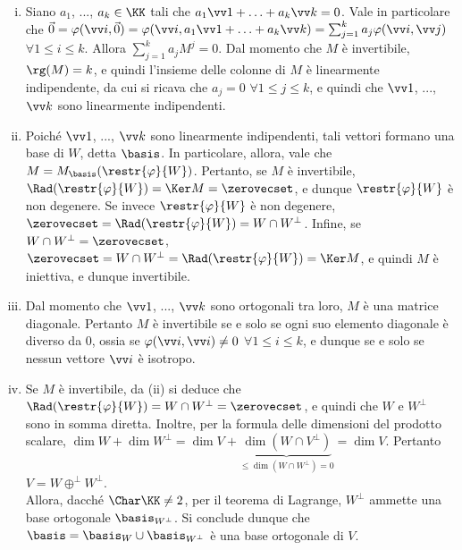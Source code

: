 \documentclass[11pt]{article}
\begin{document}
	\begin{solution}
		\begin{enumerate}[(i)]
			\item Siano $a_1$, ..., $a_k \in \KK$ tali che $a_1 \vv 1 + \ldots + a_k \vv k = 0$. Vale in
			particolare che $\vec 0 = \varphi(\vv i, \vec 0) = \varphi(\vv i, a_1 \vv 1 + \ldots + a_k \vv k) =
			\sum_{j=1}^k a_j \varphi(\vv i, \vv j)$ $\forall 1 \leq i \leq k$. Allora $\sum_{j=1}^k a_j M^j = 0$.
			Dal momento che $M$ è invertibile, $\rg(M) = k$, e quindi l'insieme delle colonne di $M$ è linearmente
			indipendente, da cui si ricava che $a_j = 0$ $\forall 1 \leq j \leq k$, e quindi che $\vv 1$, ...,
			$\vv k$ sono linearmente indipendenti.
			
			\item Poiché $\vv 1$, ..., $\vv k$ sono linearmente indipendenti, tali vettori formano una base di
			$W$, detta $\basis$. In particolare, allora, vale che $M = M_\basis(\restr{\varphi}{W})$. Pertanto,
			se $M$ è invertibile, $\Rad(\restr{\varphi}{W}) = \Ker M = \zerovecset$, e dunque $\restr{\varphi}{W}$
			è non degenere. Se invece $\restr{\varphi}{W}$ è non degenere, $\zerovecset = \Rad(\restr{\varphi}{W}) = W \cap W^\perp$. Infine, se $W \cap W^\perp = \zerovecset$, $\zerovecset = W \cap W^\perp = \Rad(\restr{\varphi}{W}) = \Ker M$, e quindi $M$ è iniettiva, e dunque invertibile.
			
			\item Dal momento che $\vv 1$, ..., $\vv k$ sono ortogonali tra loro, $M$ è una matrice diagonale.
			Pertanto $M$ è invertibile se e solo se ogni suo elemento diagonale è diverso da $0$, ossia
			se $\varphi(\vv i, \vv i) \neq 0$ $\forall 1 \leq i \leq k$, e dunque se e solo se nessun vettore
			$\vv i$ è isotropo.
			
			\item Se $M$ è invertibile, da (ii) si deduce che $\Rad(\restr{\varphi}{W}) = W \cap W^\perp = \zerovecset$,
			e quindi che $W$ e $W^\perp$ sono in somma diretta. Inoltre, per la formula delle dimensioni del prodotto
			scalare, $\dim W + \dim W^\perp = \dim V + \underbrace{\dim (W \cap V^\perp)}_{\leq \dim (W \cap W^\perp) = 0} = \dim V$. Pertanto $V = W \oplus^\perp W^\perp$. \\ 
			
			Allora, dacché $\Char \KK \neq 2$, per il teorema di Lagrange, $W^\perp$ ammette una base ortogonale $\basis_{W^\perp}$. Si conclude
			dunque che $\basis = \basis_W \cup \basis_{W^\perp}$ è una base ortogonale di $V$.
			

\end{enumerate}
\end{solution}
\end{document}

